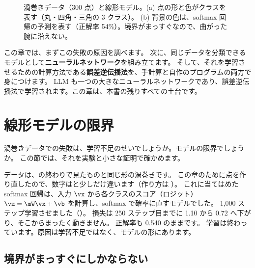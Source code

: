 \begin{figure}[tbp]
\centering
{}
\caption{渦巻きデータ（300 点）と線形モデル。(a) 点の形と色がクラスを表す（丸・四角・三角の 3 クラス）。
(b) 背景の色は、softmax 回帰の予測を表す（正解率 54\%）。境界がまっすぐなので、曲がった腕に沿えない。}
\label{fig:nn-spiral-linear}
\end{figure}

この章では、まずこの失敗の原因を調べます。
次に、同じデータを分類できるモデルとして\textbf{ニューラルネットワーク}を組み立てます。
そして、それを学習させるための計算方法である\textbf{誤差逆伝播法}を、手計算と自作のプログラムの両方で身につけます。
LLM も一つの大きなニューラルネットワークであり、誤差逆伝播法で学習されます。この章は、本書の残りすべての土台です。

\section{線形モデルの限界}\label{sec:nn-linear-limit}

渦巻きデータでの失敗は、学習不足のせいでしょうか。モデルの限界でしょうか。
この節では、それを実験と小さな証明で確かめます。

データは、の終わりで見たものと同じ形の渦巻きです。
この章のために点を作り直したので、数字はと少しだけ違います（作り方は ）。
これに当てはめた softmax 回帰は、入力 $\vx$ から各クラスのスコア（ロジット）$\vz=\mW\vx+\vb$ を計算し、softmax で確率に直すモデルでした。
1,000 ステップ学習させました（）。
損失は 250 ステップ目までに 1.10 から 0.72 へ下がり、そこからまったく動きません。
正解率も 0.540 のままです。
学習は終わっています。原因は学習不足ではなく、モデルの形にあります。

\subsection*{境界がまっすぐにしかならない}

